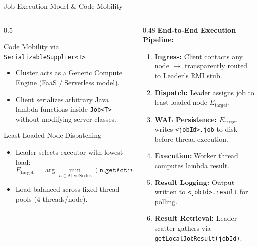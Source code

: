 \documentclass[aspectratio=169, 10pt]{beamer}
\begin{document}
\begin{frame}{Job Execution Model \& Code Mobility}
    \begin{columns}[T]
        \begin{column}{0.5\textwidth}
            \begin{block}{Code Mobility via \texttt{SerializableSupplier<T>}}
                \begin{itemize}
                    \item Cluster acts as a Generic Compute Engine (FaaS / Serverless model).
                    \item Client serializes arbitrary Java lambda functions inside \texttt{Job<T>} without modifying server classes.
                \end{itemize}
            \end{block}
            
            \begin{exampleblock}{Least-Loaded Node Dispatching}
                \begin{itemize}
                    \item Leader selects executor with lowest load:
                    \[
                        E_{\text{target}} = \arg\min_{n \in \text{AliveNodes}} (\texttt{n.getActiveJobs()})
                    \]
                    \item Load balanced across fixed thread pools (4 threads/node).
                \end{itemize}
            \end{exampleblock}
        \end{column}
        
        \begin{column}{0.48\textwidth}
            \textbf{End-to-End Execution Pipeline:}
            \begin{enumerate}
                \item \textbf{Ingress:} Client contacts any node $\to$ transparently routed to Leader's RMI stub.
                \item \textbf{Dispatch:} Leader assigns job to least-loaded node $E_{\text{target}}$.
                \item \textbf{WAL Persistence:} $E_{\text{target}}$ writes \texttt{<jobId>.job} to disk before thread execution.
                \item \textbf{Execution:} Worker thread computes lambda result.
                \item \textbf{Result Logging:} Output written to \texttt{<jobId>.result} for polling.
                \item \textbf{Result Retrieval:} Leader scatter-gathers via \texttt{getLocalJobResult(jobId)}.
            \end{enumerate}
        \end{column}
    \end{columns}
\end{frame}
\end{document}
